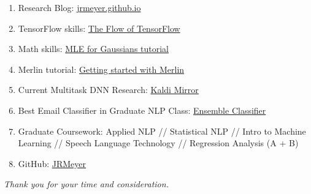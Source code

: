 \documentclass[12pt,a4paper]{article}
\begin{document}
\begin{enumerate}

\item Research Blog: \href{http://jrmeyer.github.io}{jrmeyer.github.io}
  
\item TensorFlow skills: \href{http://jrmeyer.github.io/machinelearning/2016/02/01/TensorFlow-Tutorial.html}{The Flow of TensorFlow}
  
\item Math skills: \href{http://jrmeyer.github.io/machinelearning/2017/08/18/mle.html}{MLE for Gaussians tutorial}

\item Merlin tutorial: \href{http://jrmeyer.github.io/tts/2017/02/14/Installing-Merlin.html}{Getting started with Merlin}

\item Current Multitask DNN Research: \href{https://github.com/JRMeyer/kaldi-mirror/tree/master/egs/kgz/kyrgyz-model}{Kaldi Mirror}
  
\item Best Email Classifier in Graduate NLP Class: \href{https://github.com/JRMeyer/statistical_nlp/blob/master/spam_classifier.py}{Ensemble Classifier}

\item Graduate Coursework: Applied NLP // Statistical NLP // Intro to Machine Learning // Speech Language Technology // Regression Analysis (A + B)

\item GitHub: \href{https://github.com/JRMeyer}{JRMeyer}

\end{enumerate}

    
\begin{center}
\textit{Thank you for your time and consideration.}  
\end{center}
\end{document}
